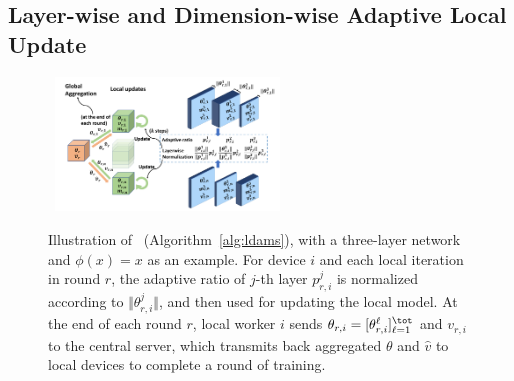 \documentclass[nohyperref]{article}
\begin{document}
\subsection{Layer-wise and Dimension-wise Adaptive Local Update}

\begin{figure}[H]
\mbox{\hspace{-0.15in}
        \includegraphics[width=0.53\textwidth]{new_figure/plot1.pdf}
}
    \vspace{-0.2in}
	\caption{Illustration of \algo\ (Algorithm~\ref{alg:ldams}), with a three-layer network and $\phi(x)=x$ as an example. %
		For device $i$ and each local iteration in round $r$, the adaptive ratio of $j$-th layer $p_{r,i}^j$ is normalized according to $\Vert \theta_{r,i}^j\Vert$, and then used for updating the local model. 
	At the end of each round $r$, local worker $i$ sends $\theta_{r,i} =  [\theta_{r,i}^{\ell}]_{\ell =1}^{\tot}$ and $v_{r,i}$ to the central server, which transmits back aggregated $\theta$ and $\hat v$ to local devices to complete a round of training.}
	\label{fig:illustrate}
\end{figure}
\end{document}
